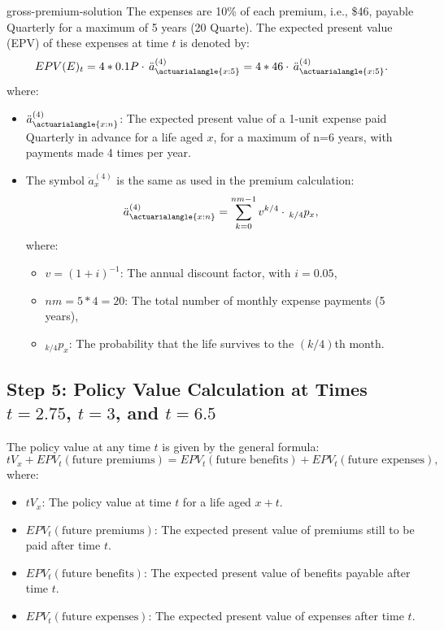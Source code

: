 \begin{solve}{}{gross-premium-solution}
		The expenses are 10\% of each premium, i.e., \$46, payable Quarterly for a maximum of 5 years (20 Quarte). The expected present value (EPV) of these expenses at time \(t\) is denoted by:
		\[
		EPV(E)_t = 4 * 0.1P \cdot \, \ddot{a}_{\actuarialangle{x:5}}^{(4)} = 4 * 46 \cdot \, \ddot{a}_{\actuarialangle{x:5}}^{(4)}.
		\]
		where:
		\begin{itemize}
			\item \(\ddot{a}_{\actuarialangle{x:n}}^{(4)}\): The expected present value of a 1-unit expense paid Quarterly in advance for a life aged \(x\), for a maximum of n=6 years, with payments made 4 times per year.
			\item The symbol \(\ddot{a}_{x}^{(4)}\) is the same as used in the premium calculation:
			\[
			\ddot{a}_{\actuarialangle{x:n}}^{(4)} = \sum_{k=0}^{nm-1} v^{k/4} \cdot \, _{k/4}p_x,
			\]
			where:
			\begin{itemize}
				\item \(v = (1+i)^{-1}\): The annual discount factor, with \(i = 0.05\),
				\item \(nm = 5*4 = 20\): The total number of monthly expense payments (5 years),
				\item \(_{k/4}p_x\): The probability that the life survives to the \((k/4)\)th month.
			\end{itemize}
		\end{itemize}
		
		
		\subsection*{Step 5: Policy Value Calculation at Times \(t = 2.75\), \(t = 3\), and \(t = 6.5\)}
		
		The policy value at any time \(t\) is given by the general formula:
		\[
		tV_x + EPV_t(\text{future premiums}) = EPV_t(\text{future benefits}) + EPV_t(\text{future expenses}),
		\]
		where:
		\begin{itemize}
			\item \(tV_x\): The policy value at time \(t\) for a life aged \(x+t\).
			\item \(EPV_t(\text{future premiums})\): The expected present value of premiums still to be paid after time \(t\).
			\item \(EPV_t(\text{future benefits})\): The expected present value of benefits payable after time \(t\).
			\item \(EPV_t(\text{future expenses})\): The expected present value of expenses after time \(t\).
		\end{itemize}
		

\end{solve}
